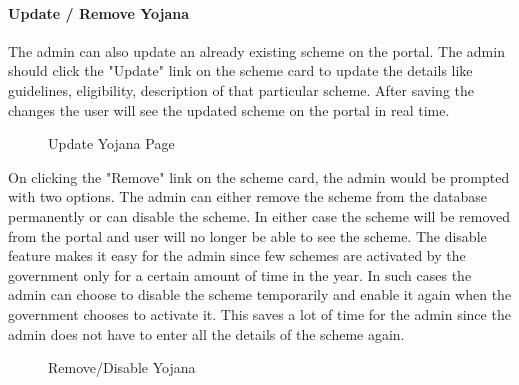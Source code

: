 \documentclass[conference]{IEEEtran}
\begin{document}
\paragraph{Update / Remove Yojana}
The admin can also update an already existing scheme on the portal. The admin should click the "Update" link on the scheme card to update the details like guidelines, eligibility, description of that particular scheme. After saving the changes the user will see the updated scheme on the portal in real time.
\begin{figure}[h!]
\centering
{}
\caption{Update Yojana Page}
\end{figure}
On clicking the "Remove" link on the scheme card, the admin would be prompted with two options. The admin can either remove the scheme from the database permanently or can disable the scheme. In either case the scheme will be removed from the portal and user will no longer be able to see the scheme. The disable feature makes it easy for the admin since few schemes are activated by the government only for a certain amount of time in the year. In such cases the admin can choose to disable the scheme temporarily and enable it again when the government chooses to activate it. This saves a lot of time for the admin since the admin does not have to enter all the details of the scheme again.
\begin{figure}[h!]
\centering
{}
\caption{Remove/Disable Yojana }
\end{figure}
\end{document}
